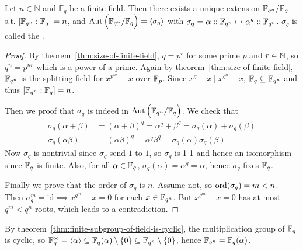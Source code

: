 \begin{theorem} \label{thm:aut-of-finite-field}
  Let $n \in \mathbb{N}$ and $\mathbb{F}_q$ be a finite field. Then there exists
  a unique extension $\mathbb{F}_{q^n} / \mathbb{F}_q$ s.t. $[\mathbb{F}_{q^n} : \mathbb{F}_q] = n$, and
  $\operatorname{Aut} \Big( \mathbb{F}_{q^n} / \mathbb{F}_q \Big) = \langle \sigma_q \rangle$ with
  $\sigma_q = \alpha :: \mathbb{F}_{q^n} \mapsto \alpha^q :: \mathbb{F}_{q^n}$.
  $\sigma_q$ is called the \emph{}.

  \begin{proof}
    By theorem~\ref{thm:size-of-finite-field},
    $q = p^r$ for some prime $p$ and $r \in \mathbb{N}$, so $q^n = p^{nr}$ which is a power of
    a prime. Again by theorem~\ref{thm:size-of-finite-field},
    $\mathbb{F}_{q^n}$ is the splitting field for $x^{p^{nr}} - x$ over $\mathbb{F}_p$.
    Since $x^q - x \mid x^{q^n} - x$, $\mathbb{F}_q \subseteq \mathbb{F}_{q^n}$ and thus $[\mathbb{F}_{q^n}: \mathbb{F}_{q}] = n$.

    Then we proof that $\sigma_q$ is indeed in $\operatorname{Aut} \Big( {\mathbb{F}_{q^n}}/{\mathbb{F}_q} \Big)$.
    We check that
    \[
      \begin{aligned}
        \sigma_q(\alpha+\beta) &= (\alpha+\beta)^q = \alpha^q + \beta^q = \sigma_q(\alpha) + \sigma_q(\beta) \\
        \sigma_q(\alpha\beta) &= (\alpha\beta)^q = \alpha^q \beta^q = \sigma_q(\alpha) \sigma_q(\beta)
      \end{aligned}
    \]
    Now $\sigma_q$ is nontrivial since $\sigma_q$ send $1$ to $1$, so $\sigma_q$ is 1-1 and hence an
    isomorphism since $\mathbb{F}_q$ is finite. Also, for all $\alpha \in \mathbb{F}_q$, $\sigma_q(\alpha)
    = \alpha^{q} = \alpha$, hence $\sigma_q$ fixes $\mathbb{F}_q$.

    Finally we prove that the order of $\sigma_q$ is $n$. Assume not, so $\operatorname{ord}(\sigma_q) = m < n$.
    Then $\sigma_q^m = \mathrm{id} \implies x^{q^m} - x=0$ for each $x \in \mathbb{F}_{q^n}$.
    But $x^{q^m} - x = 0$ has at most $q^m < q^n$ roots, which leads to a contradiction.
  \end{proof}
\end{theorem}

\begin{remark}
  By theorem~\ref{thm:finite-subgroup-of-field-is-cyclic}, the multiplication group of $\mathbb{F}_q$ is cyclic,
  so $\mathbb{F}_q^\times = \langle \alpha \rangle
  \subseteq \mathbb{F}_q(\alpha) \setminus \{0\} \subseteq \mathbb{F}_{q^n} \setminus \{0\}$,
  hence $\mathbb{F}_{q^n} = \mathbb{F}_q(\alpha)$.
\end{remark}

